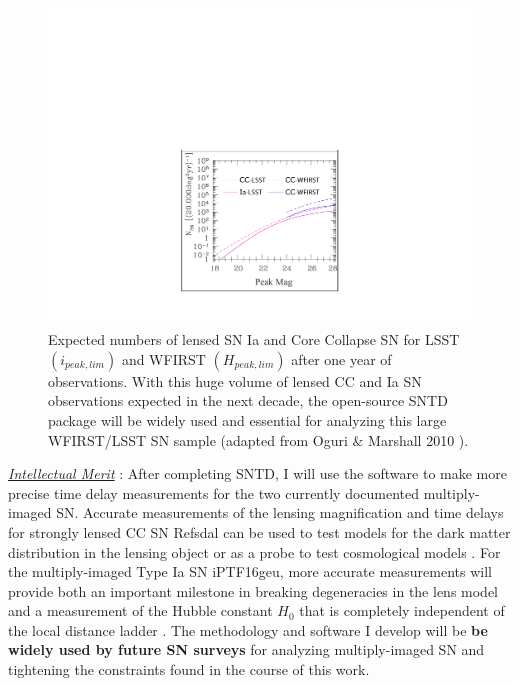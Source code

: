 \begin{figure}
\centering
\includegraphics[height=.4\textwidth]{FIG/wfirst_lsst}
\caption{
\noindent\fontsize{10}{14}\selectfont
Expected numbers of lensed SN Ia and Core Collapse SN for LSST
$(i_{peak,lim})$ and WFIRST $(H_{peak,lim})$ after one year of
observations. With this huge volume of lensed CC and Ia SN
observations expected in the next decade, the open-source SNTD package
will be widely used and essential for analyzing this large WFIRST/LSST SN sample
(adapted from Oguri $\&$ Marshall 2010 \cite{Oguri:2010a}).}
\end{figure}
\noindent\underline{\textit{Intellectual Merit}} : After completing SNTD, I
will use the software to make more precise time delay measurements for
the two currently documented multiply-imaged SN. Accurate measurements
of the lensing magnification and time delays for strongly lensed CC SN
Refsdal can be used to test models for the dark matter distribution in
the lensing object \cite{Rodney:2015a,Rodney:2016} or as a probe to
test cosmological models \cite{Suyu:2014}. For the multiply-imaged
Type Ia SN iPTF16geu, more accurate measurements will provide both an
important milestone in breaking degeneracies in the lens model and a
measurement of the Hubble constant $H_0$ that is completely
independent of the local distance
ladder \cite{Kolatt:1998,Oguri:2003b}. The methodology and software I
develop will be \textbf{be widely used by future SN surveys} for
analyzing multiply-imaged SN and tightening the constraints found in
the course of this work.

